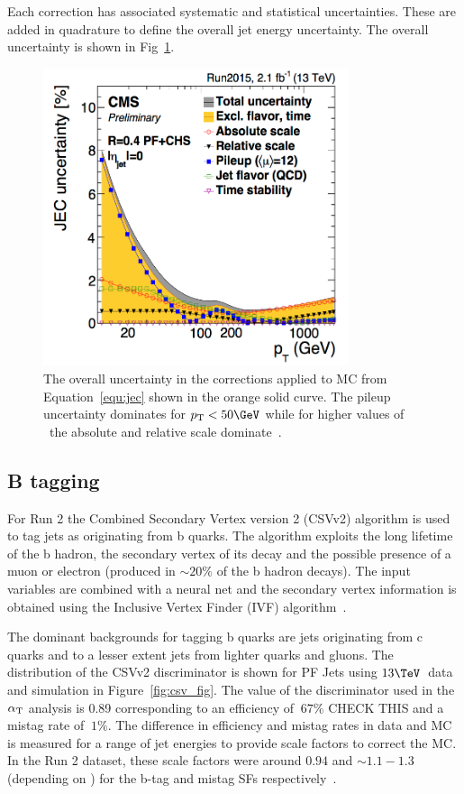 Each correction has associated systematic and statistical uncertainties. These are added in quadrature to define the overall jet energy uncertainty. The 
overall uncertainty is shown in Fig~\ref{fig:jec_unc}.

\begin{figure}
\centering
    \includegraphics[width=0.8\textwidth]{./Figures/reconstruction/jec_unc.png}
  \caption{\label{fig:jec_unc} The overall uncertainty in the corrections applied to MC from Equation~\ref{equ:jec} shown in the orange solid curve. The pileup uncertainty dominates
for $\pt < 50\GeV$ while for higher values of \pt~the absolute and relative scale dominate~\cite{jec_fig}.}
\end{figure}

\subsection{B tagging}

For Run 2 the Combined Secondary Vertex version 2 (CSVv2) algorithm is used to tag jets as originating
from b quarks. The algorithm exploits the long lifetime of the b hadron, the secondary vertex of its decay
and the possible presence of a muon or electron (produced in $\sim 20\%$ of the b hadron decays). The 
input variables are combined with a neural net and the secondary vertex
information is obtained using the Inclusive Vertex Finder (IVF) algorithm~\cite{csv_pas}.

The dominant backgrounds for tagging b quarks are jets originating from c quarks and to a lesser extent
jets from lighter quarks and gluons. The distribution of the CSVv2 discriminator is shown for PF Jets
using $13\TeV$~data and simulation in Figure~\ref{fig:csv_fig}. The value of the discriminator
used in the $\alpha_{\text{T}}$ analysis is 0.89 corresponding to an efficiency of $~67\%$ CHECK THIS and 
a mistag rate of $~1\%$. The difference in efficiency and mistag rates in data and MC is measured 
for a range of jet energies to provide scale factors to correct the MC. In the
Run 2 dataset, these scale factors were around $0.94$ and $\sim1.1-1.3$ (depending on \pt) for the b-tag and mistag SFs 
respectively~\cite{csv_fig}.

